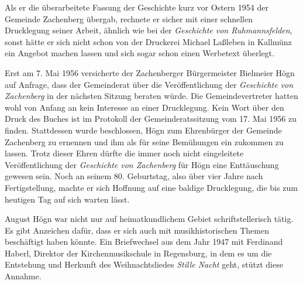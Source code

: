 Als er die überarbeitete Fassung der Geschichte kurz vor Ostern 1954 der
Gemeinde Zachenberg übergab, rechnete er sicher mit einer schnellen
Drucklegung seiner Arbeit, ähnlich wie bei der \textit{Geschichte von
Ruhmannsfelden}, sonst hätte er sich nicht schon von der Druckerei
Michael Laßleben in Kallmünz ein Angebot machen lassen und sich sogar
schon einen Werbetext überlegt.

Erst am 7. Mai 1956 versicherte der Zachenberger Bürgermeister Bielmeier
Högn auf Anfrage, dass der Gemeinderat über die Veröffentlichung der
\textit{Geschichte von Zachenberg} in der nächsten Sitzung beraten
würde. Die Gemeindevertreter hatten wohl von Anfang an kein Interesse
an einer Drucklegung. Kein Wort über den Druck des Buches ist im
Protokoll der Gemeinderatssitzung vom 17. Mai 1956 zu finden.
Stattdessen wurde beschlossen, Högn zum Ehrenbürger der Gemeinde
Zachenberg zu ernennen und ihm als für seine Bemühungen ein  zukommen zu lassen. Trotz dieser Ehren dürfte die
immer noch nicht eingeleitete Veröffentlichung der \textit{Geschichte
von Zachenberg} für Högn eine Enttäuschung gewesen sein. Noch an
seinem 80. Geburtstag, also über vier Jahre nach Fertigstellung, machte
er sich Hoffnung auf eine baldige Drucklegung, die bis zum heutigen Tag
auf sich warten lässt.

August Högn war nicht nur auf heimatkundlichem Gebiet schriftstellerisch
tätig. Es gibt Anzeichen dafür, dass er sich auch mit musikhistorischen
Themen beschäftigt haben könnte. Ein Briefwechsel aus dem Jahr 1947
mit Ferdinand Haberl, Direktor der Kirchenmusikschule in Regensburg,
in dem es um die Entstehung und Herkunft des Weihnachtsliedes
\textit{Stille Nacht} geht, stützt diese Annahme.